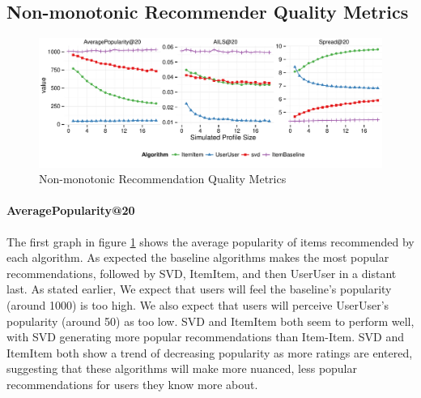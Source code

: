 \documentclass[letterpaper]{sig-alternate}
\begin{document}


\subsection*{Non-monotonic Recommender Quality Metrics}
\vspace{-1.5em}
\begin{figure}[ht!]
  \centering
  \includegraphics[width=\linewidth]{../lenskit/output/ekstrandTuned20/popdiv.pdf}
  \caption{Non-monotonic Recommendation Quality Metrics}
  \label{fig:pop}
\end{figure}
%
  \paragraph{AveragePopularity@20}
  The first graph in figure \ref{fig:pop} shows the average popularity of items recommended by each algorithm.
  As expected the baseline algorithms makes the most popular recommendations, followed by SVD, ItemItem, and then UserUser in a distant last.
  As stated earlier, We expect that users will feel the baseline's popularity (around 1000) is too high.
  We also expect that users will perceive UserUser's popularity (around 50) as too low.
  SVD and ItemItem both seem to perform well, with SVD generating more popular recommendations than Item-Item.
  SVD and ItemItem both show a trend of decreasing popularity as more ratings are entered, suggesting that these algorithms will make more nuanced, less popular recommendations for users they know more about.
\end{document}
